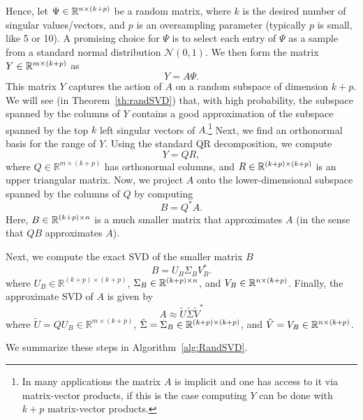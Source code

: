 Hence, let $ \Psi \in \mathbb{R}^{n \times (k + p)} $ be a  random matrix, where $ k $ is the desired number of singular values/vectors,
and $ p $ is an oversampling parameter (typically $ p $ is small, like 5 or 10).  A promising choice for $ \Psi $ is to select
each entry of $ \Psi $ as a sample from a standard normal distribution $ \mathcal{N}(0, 1) $.
We then form the matrix $ Y \in \mathbb{R}^{m \times (k + p)} $ as
$$
Y = A \Psi.
$$
This matrix $ Y $ captures the action of $ A $ on a random subspace of dimension $ k + p $. We will see (in Theorem~\ref{th:randSVD}) that, with high probability, the subspace spanned by the columns of $ Y $ contains a good approximation of the subspace spanned by the top $ k $ left singular vectors of $ A $.\footnote{In many applications the matrix $A$ is implicit and one has access to it via matrix-vector products, if this is the case computing $Y$ can be done with $k+p$ matrix-vector products.}
Next, we find an orthonormal basis for the range of $ Y $. Using the standard QR decomposition, we compute
$$
Y = Q R,
$$
where $ Q \in \mathbb{R}^{m \times (k + p)} $ has orthonormal columns, and $ R \in \mathbb{R}^{(k + p) \times (k + p)} $ is an upper triangular matrix.
Now, we project $ A $ onto the lower-dimensional subspace spanned by the columns of $ Q $ by computing
$$
B = Q^{\ast} A.
$$
Here, $ B \in \mathbb{R}^{(k + p) \times n} $ is a much smaller matrix that approximates $ A $ (in the sense that $QB$ approximates $A$).

Next, we compute the exact SVD of the smaller matrix $ B $
$$
B = U_B \Sigma_B V_B^{\ast}.
$$
where $U_B \in \mathbb{R}^{(k + p) \times (k + p)} $, $ \Sigma_B \in \mathbb{R}^{(k + p) \times n} $, and $ V_B \in \mathbb{R}^{n \times  (k + p)} $.
Finally, the approximate SVD of $ A $ is given by
$$
A \approx \tilde{ U} \tilde{ \Sigma} \tilde{V}^{\ast}
$$
where $ \tilde{U} = Q U_B \in \mathbb{R}^{m \times (k + p)} $, $ \tilde{\Sigma} = \Sigma_B \in \mathbb{R}^{ (k + p) \times  (k + p)} $, and $ \tilde{V} = V_B \in \mathbb{R}^{n \times  (k + p)} $.



We summarize these steps in Algorithm~\ref{alg:RandSVD}.

